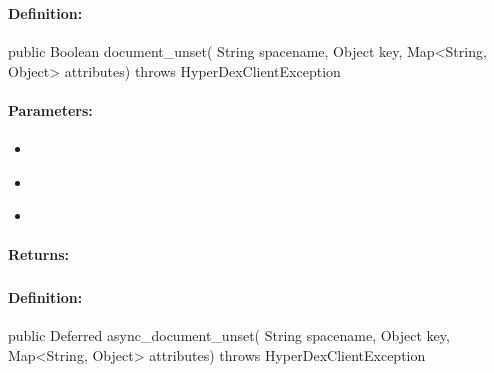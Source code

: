 \pagebreak
\subsubsection{}
\label{api:java:document_unset}


\paragraph{Definition:}
\begin{javacode}
public Boolean document_unset(
        String spacename,
        Object key,
        Map<String, Object> attributes) throws HyperDexClientException
\end{javacode}

\paragraph{Parameters:}
\begin{itemize}[noitemsep]
\item {}\\

\item {}\\

\item {}\\

\end{itemize}

\paragraph{Returns:}


\pagebreak
\subsubsection{}
\label{api:java:async_document_unset}


\paragraph{Definition:}
\begin{javacode}
public Deferred async_document_unset(
        String spacename,
        Object key,
        Map<String, Object> attributes) throws HyperDexClientException
\end{javacode}

